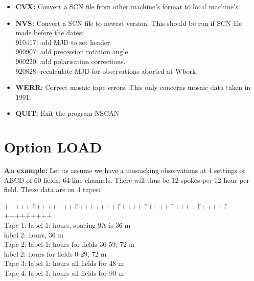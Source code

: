 \begin{itemize}
\item {\bf CVX:} 
Convert a SCN file from other machine's format to local machine's. 

\item {\bf NVS:} 
Convert a SCN file to newest version. 
This should be run if SCN file made before the dates: 
 \\          910417: add MJD to set header. 
 \\          900907: add precession rotation angle. 
 \\          900220: add polarisation corrections. 
 \\          920828: recalculate MJD for observations aborted at Wbork. 

\item {\bf WERR:} 
Correct mosaic tape errors. This only concerns mosaic data taken in 1991. 

\item {\bf QUIT:} 
Exit the program NSCAN 
\end{itemize} 



\section{Option LOAD} 
\label{nscan.descr.load} 

{\bf An example:} 
Let us assume we have a mosaicking observations at 4 settings of ABCD of 60
fields, 64 line channels. There will thus be 12 spokes per 12 hour per field. 
These data are on 4 tapes: 

\vspace{-0.8cm}                                 %
\begin{tabbing} 
+++++\=++++++++\=++++++++\=+++++\=+++++\=+++++\=+++++\=+++++\=+++++\= \kill
 \\ \> Tape 1: \> label 1:  hours, spacing 9A is 36 m 
 \\ \>         \> label 2:  hours, 36 m 
 \\ \> Tape 2: \> label 1:  hours for fields 30-59, 72 m 
 \\ \>        \> label 2:  hours for fields 0-29, 72 m 
 \\ \> Tape 3: \> label 1:  hours all fields for 48 m 
 \\ \> Tape 4: \> label 1:  hours all fields for 90 m 
\end{tabbing} 
\vspace{-0.4cm}                                 %


